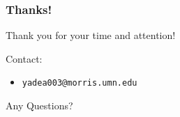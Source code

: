 \documentclass{beamer}
\newcommand{\linespace}{\vskip 0.25cm}
\begin{document}
\begin{frame}
	\frametitle{Thanks!}
	
	Thank you for your time and attention!
		
	\linespace
	\linespace
	
	Contact:  
	\begin{itemize}
		\item \texttt{yadea003@morris.umn.edu}
	\end{itemize}
	
	\linespace
	\linespace
	
	\begin{center}
	{\huge Any Questions?}
	\end{center}
\end{frame}
\end{document}
